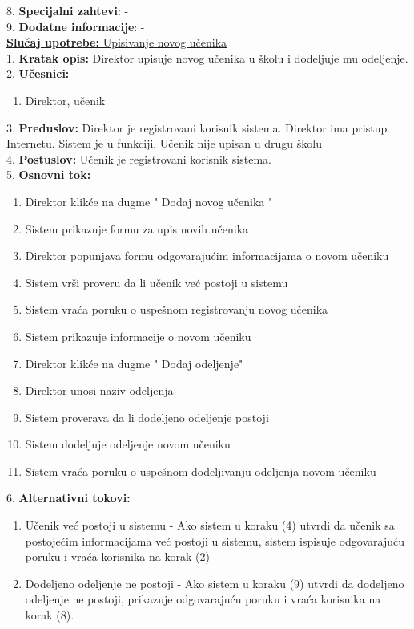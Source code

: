 \documentclass{article}
\begin{document}
8. \textbf{Specijalni zahtevi}: - \\

9. \textbf{Dodatne informacije}: - \\


\underline{\textbf{Slučaj upotrebe:} Upisivanje novog učenika} \\

1. \textbf{Kratak opis:}  Direktor upisuje novog učenika u školu i dodeljuje mu odeljenje. \\

2. \textbf{Učesnici:}
\begin{enumerate} 
\item Direktor, učenik
\end{enumerate} 

3. \textbf{Preduslov:} Direktor je registrovani korisnik sistema. Direktor ima pristup Internetu. Sistem je u funkciji. Učenik nije upisan u drugu školu\\

4. \textbf{Postuslov:}  Učenik je registrovani korisnik sistema.\\

5. \textbf{Osnovni tok:} 
\begin{enumerate} 
\item Direktor klikće na dugme " {Dodaj} novog učenika " 
\item Sistem prikazuje formu za upis novih učenika
\item Direktor popunjava formu odgovarajućim informacijama o novom učeniku
\item Sistem vrši proveru da li učenik već postoji u sistemu
\item Sistem vraća poruku o uspešnom registrovanju novog učenika
\item Sistem prikazuje informacije o novom učeniku
\item Direktor klikće na dugme " {Dodaj}  odeljenje"
\item Direktor unosi naziv odeljenja 
\item Sistem proverava da li dodeljeno odeljenje postoji
\item Sistem dodeljuje odeljenje novom učeniku 
\item Sistem vraća poruku o uspešnom dodeljivanju odeljenja novom učeniku
\end{enumerate}

6. \textbf{Alternativni tokovi:}
\begin{enumerate} 
\item Učenik već postoji u sistemu - Ako sistem u koraku (4) utvrdi da učenik sa postojećim informacijama već postoji u sistemu, sistem ispisuje odgovarajuću poruku i vraća korisnika na korak (2) 
\item Dodeljeno odeljenje ne postoji - Ako sistem u koraku (9) utvrdi da dodeljeno odeljenje ne postoji, prikazuje odgovarajuću poruku i vraća korisnika na korak (8).
\end{enumerate}
\end{document}
